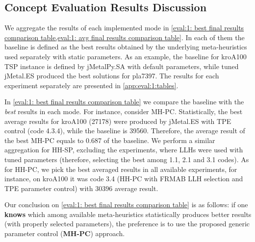 \subsection{Concept Evaluation Results Discussion}
We aggregate the results of each implemented mode in \cref{eval:1: best final results comparison table,eval:1: avg final results comparison table}. In each of them the baseline is defined as the best results obtained by the underlying meta-heuristics used separately with static parameters. As an example, the baseline for kroA100 TSP instance is defined by jMetalPy.SA with default parameters, while tuned jMetal.ES produced the best solutions for pla7397. The results for each experiment separately are presented in \cref{app:eval:1:tables}.

In \cref{eval:1: best final results comparison table} we compare the baseline with the \emph{best} results in each mode. For instance, consider MH-PC. Statistically, the best average results for kroA100 (27178) were produced by jMetal.ES with TPE control (code 4.3.4), while the baseline is 39560. Therefore, the average result of the best MH-PC equals to 0.687 of the baseline. We perform a similar aggregation for HH-SP, excluding the experiments, where LLHs were used with tuned parameters (therefore, selecting the best among 1.1, 2.1 and 3.1 codes). As for HH-PC, we pick the best averaged results in all available experiments, for instance, on kroA100 it was code 3.4 (HH-PC with FRMAB LLH selection and TPE parameter control) with 30396 average result.

Our conclusion on \cref{eval:1: best final results comparison table} is as follows: if one \textbf{knows} which among available meta-heuristics statistically produces better results (with properly selected parameters), the preference is to use the proposed generic parameter control (\textbf{MH-PC}) approach. 

